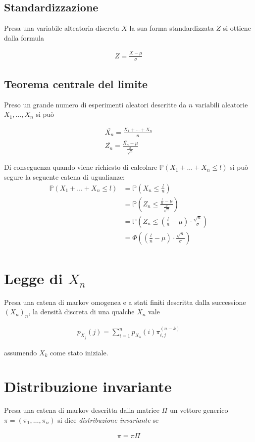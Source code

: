 \documentclass{article}
\begin{document}
\subsection{Standardizzazione}

Presa una variabile alteatoria discreta $X$ la sua forma standardizzata $Z$ si ottiene dalla formula

\begin{align*}
Z = \frac{X-\mu}{\sigma}
\end{align*}

\subsection{Teorema centrale del limite}

Preso un grande numero di esperimenti aleatori descritte da $n$ variabili aleatorie $X_1, \ldots, X_n$ si pu\`o

\begin{align*}
\overline{X_n} = \frac{X_1 + \ldots + X_n}{n} \\
\overline{Z_n} = \frac{\overline{X_n} - \mu}{\frac{\sigma}{\sqrt{n}}}
\end{align*}

Di conseguenza quando viene richiesto di calcolare $\mathbb{P}(X_1 + \ldots + X_n \leq l)$ si pu\`o segure la seguente catena di ugualianze:
\begin{align*}
\mathbb{P}(X_1 + \ldots + X_n \leq l) &= \mathbb{P}(X_n \leq \frac{l}{n})\\
&= \mathbb{P}(Z_n \leq \frac{\frac{l}{n} - \mu}{\frac{\sigma}{\sqrt{n}}}) \\
&= \mathbb{P}(Z_n \leq (\frac{l}{n} - \mu) \cdot \frac{\sqrt{n}}{\sigma}) \\
&= \Phi((\frac{l}{n} - \mu) \cdot \frac{\sqrt{n}}{\sigma}) \\
\end{align*}

\section{Legge di $X_n$}

Presa una catena di markov omogenea e a stati finiti descritta dalla successione $(X_n)_n$, la densit\`a discreta di una qualche $X_n$ vale

\begin{align*}
p_{X_j}(j) = \sum_{i=1}^n p_{X_k}(i) \pi_{i,j}^{(n-k)}
\end{align*}

assumendo $X_k$ come stato iniziale.

\section{Distribuzione invariante}

Presa una catena di markov descritta dalla matrice $\Pi$ un vettore generico $\pi = (\pi_1, \ldots, \pi_n)$ si dice \emph{distribuzione invariante} se

\begin{align*}
\pi = \pi \Pi
\end{align*}
\end{document}
